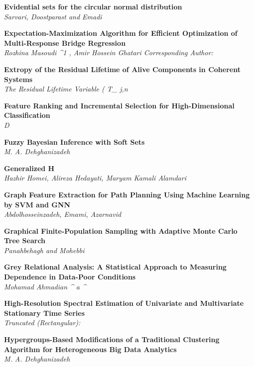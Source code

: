 \noindent
{\bf
Evidential sets for the circular normal distribution
}\dotfill \pageref{p.1049}\\
{\small \it
Sarvari, Doostparast and Emadi
}


\noindent
{\bf
Expectation-Maximization Algorithm for Efficient Optimization of Multi-Response Bridge Regression
}\dotfill \pageref{p.1301}\\
{\small \it
Rozhina Masoudi ^1 , Amir Hossein Ghatari Corresponding Author:
}


\noindent
{\bf
Extropy of the Residual Lifetime of Alive Components in Coherent Systems
}\dotfill \pageref{p.1260}\\
{\small \it
The Residual Lifetime Variable ( T_ j,n
}


\noindent
{\bf
Feature Ranking and Incremental Selection for High-Dimensional Classification
}\dotfill \pageref{p.1315}\\
{\small \it
D
}


\noindent
{\bf
Fuzzy Bayesian Inference with Soft Sets
}\dotfill \pageref{p.1123}\\
{\small \it
M. A. Dehghanizadeh
}


\noindent
{\bf
Generalized H
}\dotfill \pageref{p.1232}\\
{\small \it
Hazhir Homei, Alireza Hedayati, Maryam Kamali Alamdari
}


\noindent
{\bf
Graph Feature Extraction for Path Planning Using Machine Learning by SVM and GNN
}\dotfill \pageref{p.1243}\\
{\small \it
Abdolhosseinzadeh, Emami, Azarnavid
}


\noindent
{\bf
Graphical Finite-Population Sampling with Adaptive Monte Carlo Tree Search
}\dotfill \pageref{p.1340}\\
{\small \it
Panahbehagh and Mohebbi
}


\noindent
{\bf
Grey Relational Analysis: A Statistical Approach to Measuring Dependence in Data-Poor Conditions
}\dotfill \pageref{p.1268}\\
{\small \it
Mohamad Ahmadian ^ a ^ \
}


\noindent
{\bf
High-Resolution Spectral Estimation of Univariate and Multivariate Stationary Time Series
}\dotfill \pageref{p.1354}\\
{\small \it
Truncated (Rectangular):
}


\noindent
{\bf
Hypergroups-Based Modifications of a Traditional Clustering Algorithm for Heterogeneous Big Data Analytics
}\dotfill \pageref{p.1121}\\
{\small \it
M. A. Dehghanizadeh
}



